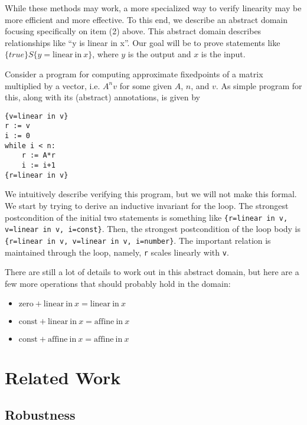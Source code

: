 \documentclass{llncs}
\newcommand{\zero}{\mathrm{zero}}
\newcommand{\const}{\mathrm{const}}
\newcommand{\afin}{\mathrm{affine\ in\ }}
\newcommand{\linin}{\mathrm{linear\ in\ }}
\begin{document}
While these methods may work, a more specialized way to verify linearity may be more efficient and more effective. To this end, we describe an abstract domain focusing specifically on item (2) above. This abstract domain describes relationships like ``y is linear in x''. Our goal will be to prove statements like
$\{true\} S \{y = \mathrm{linear\ in\ }x\}$, where $y$
is the output and $x$ is the input.

Consider a program for computing approximate fixedpoints of a matrix multiplied by a vector, i.e. $A^n v$ for some given $A$, $n$, and $v$. As simple program for this, along with its (abstract) annotations, is given by

\begin{verbatim}
{v=linear in v}
r := v
i := 0
while i < n:
    r := A*r
    i := i+1
{r=linear in v}
\end{verbatim}

We intuitively describe verifying this program, but we will not make this formal. We start by trying to derive an inductive invariant for the loop. The strongest postcondition of the initial two statements is something like \texttt{\{r=linear in v, v=linear in v, i=const\}}. Then, the strongest postcondition of the loop body is \texttt{\{r=linear in v, v=linear in v, i=number\}}. The important relation is maintained through the loop, namely, \texttt{r} scales linearly with \texttt{v}.

There are still a lot of details to work out in this abstract domain, but here are a few more operations that should probably hold in the domain:
\begin{itemize}
	\item $\zero + \linin x = \linin x$
    \item $\const + \linin x = \afin x$
    \item $\const + \afin x = \afin x$
\end{itemize}
\fi

\section{Related Work}

\subsection{Robustness}
\end{document}
